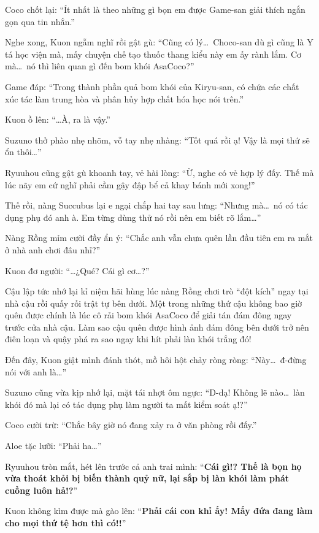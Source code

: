 \documentclass[../main.tex]{subfiles}
\begin{document}
Coco chốt lại: ``Ít nhất là theo những gì bọn em được Game-san giải thích ngắn gọn qua tin nhắn.''

Nghe xong, Kuon ngẫm nghĩ rồi gật gù: ``Cũng có lý\dots\ Choco-san dù gì cũng là Y tá học viện mà, mấy chuyện chế tạo thuốc thang kiểu này em ấy rành lắm. Cơ mà\dots\ nó thì liên quan gì đến bom khói AsaCoco?''

Game đáp: ``Trong thành phần quả bom khói của Kiryu-san, có chứa các chất xúc tác làm trung hòa và phân hủy hợp chất hóa học nói trên.''

Kuon ồ lên: ``\dots À, ra là vậy.''

Suzuno thở phào nhẹ nhõm, vỗ tay nhẹ nhàng: ``Tốt quá rồi ạ! Vậy là mọi thứ sẽ ổn thôi\dots''

Ryuuhou cũng gật gù khoanh tay, vẻ hài lòng: ``Ừ, nghe có vẻ hợp lý đấy. Thế mà lúc nãy em cứ nghĩ phải cầm gậy đập bể cả khay bánh mới xong!''

Thế rồi, nàng Succubus lại e ngại chắp hai tay sau lưng: ``Nhưng mà\dots\ nó có tác dụng phụ đó anh à. Em từng dùng thử nó rồi nên em biết rõ lắm\dots''

Nàng Rồng mỉm cười đầy ẩn ý: ``Chắc anh vẫn chưa quên lần đầu tiên em ra mắt ở nhà anh chơi đâu nhỉ?''

Kuon đơ người: ``\dots ¿Qué? Cái gì cơ\dots?''

Cậu lập tức nhớ lại kỉ niệm hãi hùng lúc nàng Rồng chơi trò ``đột kích'' ngay tại nhà cậu rồi quấy rối trật tự bên dưới. Một trong những thứ cậu không bao giờ quên được chính là lúc cô rải bom khói AsaCoco để giải tán đám đông ngay trước cửa nhà cậu. Làm sao cậu quên được hình ảnh đám đông bên dưới trở nên điên loạn và quậy phá ra sao ngay khi hít phải làn khói trắng đó!

Đến đây, Kuon giật mình đánh thót, mồ hôi hột chảy ròng ròng: ``Này\dots\ đ-đừng nói với anh là\dots''

Suzuno cũng vừa kịp nhớ lại, mặt tái nhợt ôm ngực: ``D-dạ! Không lẽ nào\dots\ làn khói đó mà lại có tác dụng phụ làm người ta mất kiểm soát ạ!?''

Coco cười trừ: ``Chắc bây giờ nó đang xảy ra ở văn phòng rồi đấy.''

Aloe tặc lưỡi: ``Phải ha\dots''

Ryuuhou tròn mắt, hét lên trước cả anh trai mình: ``\textbf{Cái gì!? Thế là bọn họ vừa thoát khỏi bị biến thành quỷ nữ, lại sắp bị làn khói làm phát cuồng luôn hả!?}''

Kuon không kìm được mà gào lên: ``\textbf{Phải cái con khỉ ấy! Mấy đứa đang làm cho mọi thứ tệ hơn thì có!!}''
\end{document}
